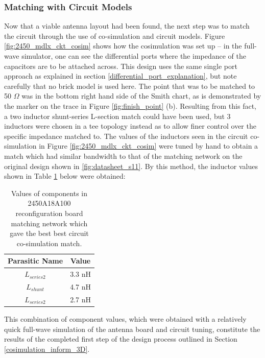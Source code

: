 \documentclass[12pt]{usfcoe}
\begin{document}
    
    \subsubsection{Matching with Circuit Models}
    
    Now that a viable antenna layout had been found, the next step was to match the circuit through the use of co-simulation and circuit models.
    Figure \ref{fig:2450_mdlx_ckt_cosim} shows how the cosimulation was set up -- in the full-wave simulator, one can see the differential ports where the impedance of the capacitors are to be attached across. 
    This design uses the same single port approach as explained in section \ref{differential_port_explanation}, but note carefully that no brick model is used here. 
    The point that was to be matched to 50 $\Omega$ was in the bottom right hand side of the Smith chart, as is demonstrated by the marker on the trace in Figure \ref{fig:finish_point} (b). 
    Resulting from this fact, a two inductor shunt-series L-section match could have been used, but 3 inductors were chosen in a tee topology instead as to allow finer control over the specific impedance matched to.
    The values of the inductors seen in the circuit co-simulation in Figure \ref{fig:2450_mdlx_ckt_cosim} were tuned by hand to obtain a match which had similar bandwidth to that of the matching network on the original design shown in \ref{fig:datasheet_s11}. 
    By this method, the inductor values shown in Table \ref{tbl:2450_ckt_vals} below were obtained:
        
	\begin{table}[H]
	\centering
	\begin{tabular}{|c|c|}
		\hline  
		 Parasitic Name & Value \\
		 \hline
		 $L_{series2}$ & 3.3 nH \\
		 \hline
		 $L_{shunt}$ & 4.7 nH \\
		 \hline
		 $L_{series2}$ & 2.7 nH \\
		 \hline
	\end{tabular}
	\caption{Values of components in 2450A18A100 reconfiguration board matching network which gave the best best circuit co-simulation match.}
	\label{tbl:2450_ckt_vals}
	\end{table}

    This combination of component values, which were obtained with a relatively quick full-wave simulation of the antenna board and circuit tuning, constitute the results of the completed first step of the design process outlined in Section \ref{cosimulation_inform_3D}.
\end{document}
